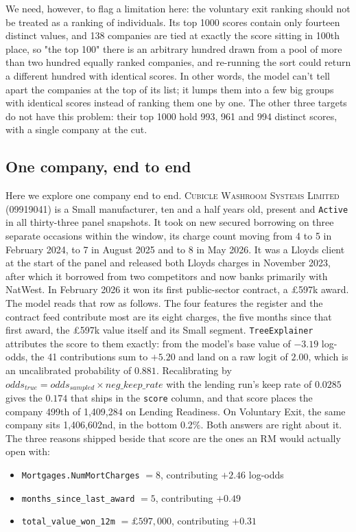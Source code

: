 \documentclass[    author={Samuel Menon Demelo; Sneha Saphala Ram Prasad; 
Viktor Ander Lindholm; Vishal Khatri},
               supervisor={Prof. Fernando Moreno-Pino},
                   degree={MSc},
                    title={Lloyds Commercial Banking Intelligence},
                 subtitle={Ranking SME Lending, Risk and Growth Prospects for Lloyds Banking Group},
                     type={},
                     year={2026}]{dissertation}
\begin{document}
We need, however, to flag a limitation here: the voluntary exit ranking should not be treated as a ranking of individuals. Its top 1000 scores contain only fourteen distinct values, and 138
companies are tied at exactly the score sitting in 100th place, so "the top 100" there is an
arbitrary hundred drawn from a pool of more than two hundred equally ranked companies, and
re-running the sort could return a different hundred with identical scores. In other words, the model can't tell apart the companies at the top of its list; it lumps them into a few big groups with identical scores instead of ranking them one by one. The other three targets do not have this problem: their top 1000 hold 993, 961 and 994 distinct scores, with a single company at the cut.

\subsection{One company, end to end}
Here we explore one company end to end. \textsc{Cubicle Washroom Systems Limited} (09919041) is a Small manufacturer, ten and a half years old, present and \texttt{Active} in all thirty-three panel snapshots. It took on new secured borrowing on three separate occasions within the window, its charge count moving from 4 to 5 in February 2024, to 7 in August 2025 and to 8 in May 2026. It was a Lloyds client at the start of the panel and released both Lloyds charges in November 2023, after which it borrowed from two competitors and now banks primarily with NatWest. In February 2026 it won its first public-sector contract, a £597k award. The model reads that row as follows. The four features the register and the contract feed contribute most are its eight charges, the five months since that first award, the £597k value itself and its Small segment. \texttt{TreeExplainer} attributes the score to them exactly: from the model's base value of $-3.19$ log-odds, the 41 contributions sum to $+5.20$ and land on a raw logit of $2.00$, which is an uncalibrated probability of $0.881$. Recalibrating by $odds_{true} = odds_{sampled} \times neg\_keep\_rate$ with the lending run's keep rate of $0.0285$ gives the $0.174$ that ships in the \texttt{score} column, and that score places the company 499th of 1{,}409{,}284 on Lending Readiness. On Voluntary Exit, the same company sits 1{,}406{,}602nd, in the bottom 0.2\%. Both answers are right about it. The three reasons shipped beside that score are the ones an RM would actually open with: 
\begin{itemize} 
\item \texttt{Mortgages.NumMortCharges} $= 8$, contributing $+2.46$ log-odds
\item \texttt{months\_since\_last\_award} $= 5$, contributing $+0.49$
\item \texttt{total\_value\_won\_12m} $= \pounds597{,}000$, contributing $+0.31$
\end{itemize}
\end{document}

